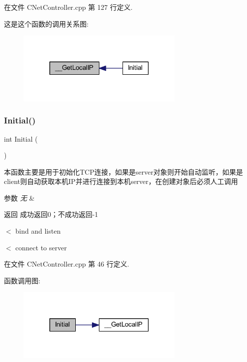 在文件 C\+Net\+Controller.\+cpp 第 127 行定义.

这是这个函数的调用关系图\+:\nopagebreak
\begin{figure}[H]
\begin{center}
\leavevmode
\includegraphics[width=230pt]{class_c_net_controller_aa231c51362064abdd6bce973f73dca8e_icgraph}
\end{center}
\end{figure}
\mbox{\label{class_c_net_controller_afeccfc8409078f390fe6e7b8c7e9b4b6}} 
\subsubsection{\texorpdfstring{Initial()}{Initial()}}
{\footnotesize\ttfamily int Initial (\begin{DoxyParamCaption}{ }\end{DoxyParamCaption})}



本函数主要是用于初始化\+T\+C\+P连接，如果是server对象则开始自动监听，如果是client则自动获取本机\+I\+P并进行连接到本机server，在创建对象后必须人工调用 


\begin{DoxyParams}{参数}
{\em 无} & \\
\hline
\end{DoxyParams}
\begin{DoxyReturn}{返回}
成功返回0；不成功返回-\/1 
\end{DoxyReturn}
$<$ bind and listen

$<$ connect to server 

在文件 C\+Net\+Controller.\+cpp 第 46 行定义.

函数调用图\+:\nopagebreak
\begin{figure}[H]
\begin{center}
\leavevmode
\includegraphics[width=230pt]{class_c_net_controller_afeccfc8409078f390fe6e7b8c7e9b4b6_cgraph}
\end{center}
\end{figure}
\mbox{\label{class_c_net_controller_a9d08826c3ea2a87cf17990318fab9dd3}} 
